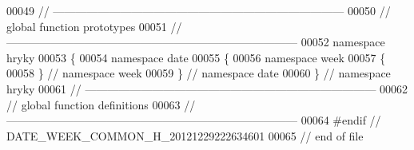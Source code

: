\begin{DoxyCode}
00049 \textcolor{comment}{//
      ------------------------------------------------------------------------------}
00050 \textcolor{comment}{// global function prototypes}
00051 \textcolor{comment}{//
      ------------------------------------------------------------------------------}
00052 \textcolor{keyword}{namespace }hryky
00053 \{
00054 \textcolor{keyword}{namespace }date
00055 \{
00056 \textcolor{keyword}{namespace }week
00057 \{
00058 \} \textcolor{comment}{// namespace week}
00059 \} \textcolor{comment}{// namespace date}
00060 \} \textcolor{comment}{// namespace hryky}
00061 \textcolor{comment}{//
      ------------------------------------------------------------------------------}
00062 \textcolor{comment}{// global function definitions}
00063 \textcolor{comment}{//
      ------------------------------------------------------------------------------}
00064 \textcolor{preprocessor}{#endif // DATE\_WEEK\_COMMON\_H\_20121229222634601}
00065 \textcolor{preprocessor}{}\textcolor{comment}{// end of file}
\end{DoxyCode}
